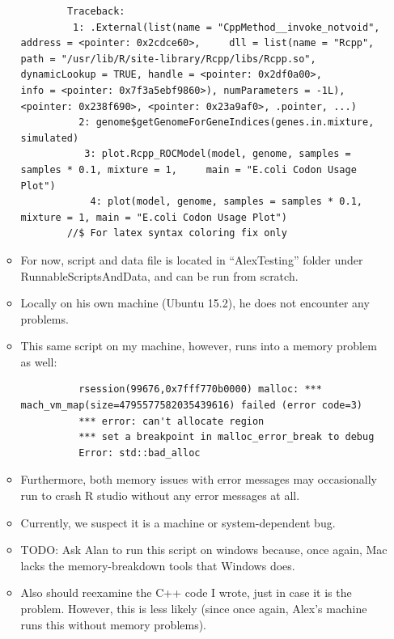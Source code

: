 \documentclass[12pt,hyperref]{labbook}
\begin{document}
\begin{itemize}
\begin{itemize}
\begin{lstlisting}
        Traceback:
         1: .External(list(name = "CppMethod__invoke_notvoid", address = <pointer: 0x2cdce60>,     dll = list(name = "Rcpp", path = "/usr/lib/R/site-library/Rcpp/libs/Rcpp.so",         dynamicLookup = TRUE, handle = <pointer: 0x2df0a00>,         info = <pointer: 0x7f3a5ebf9860>), numParameters = -1L),     <pointer: 0x238f690>, <pointer: 0x23a9af0>, .pointer, ...)
          2: genome$getGenomeForGeneIndices(genes.in.mixture, simulated)
           3: plot.Rcpp_ROCModel(model, genome, samples = samples * 0.1, mixture = 1,     main = "E.coli Codon Usage Plot")
            4: plot(model, genome, samples = samples * 0.1, mixture = 1, main = "E.coli Codon Usage Plot")
        //$ For latex syntax coloring fix only
        \end{lstlisting}
        \item For now, script and data file is located in \enquote{AlexTesting} folder under RunnableScriptsAndData, and can be run from scratch.
        \item Locally on his own machine (Ubuntu 15.2), he does not encounter any problems.
        \item This same script on my machine, however, runs into a memory problem as well:
        \begin{lstlisting}
          rsession(99676,0x7fff770b0000) malloc: *** mach_vm_map(size=4795577582035439616) failed (error code=3)
          *** error: can't allocate region
          *** set a breakpoint in malloc_error_break to debug
          Error: std::bad_alloc
        \end{lstlisting}
        \item Furthermore, both memory issues with error messages may occasionally run to crash R studio without any error messages at all.
        \item Currently, we suspect it is a machine or system-dependent bug.
        \item TODO: Ask Alan to run this script on windows because, once again, Mac lacks the memory-breakdown tools that Windows does.
        \item Also should reexamine the C++ code I wrote, just in case it is the problem.
        However, this is less likely (since once again, Alex's machine runs this without memory problems).
    \end{itemize}
\end{itemize}

\end{document}

